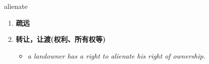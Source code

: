 
\begin{frame}
{\huge alienate}
\begin{center}
\begin{enumerate}\Large
  \item \textbf{疏远}
  \item \textbf{转让，让渡(权利、所有权等)}
  \begin{itemize}
    \item \em{\Large{a landowner has a right to alienate his right of ownership.}}
  \end{itemize}
\end{enumerate}
\end{center}
\end{frame}

